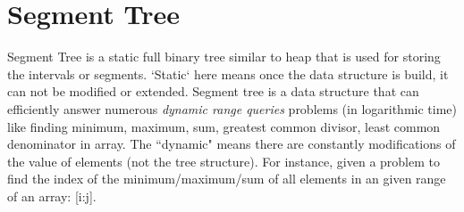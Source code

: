 \documentclass[data-structure.tex]{subfiles}
\begin{document}




\section{Segment Tree}
\label{sec_segment_tree}


Segment Tree is a static full binary tree similar to heap that is used for storing the intervals or segments. `Static` here means once the data structure is build, it can not be modified or extended.  Segment tree is a data structure that can efficiently answer numerous \textit{dynamic range queries} problems 
(in logarithmic time) like finding minimum, maximum, sum, greatest common divisor, least common denominator in array. The ``dynamic" means there are constantly modifications of the value of elements (not the tree structure).   For instance, given a problem to find the index of the minimum/maximum/sum of all elements in an given range of an array: [i:j]. 
\end{document}
